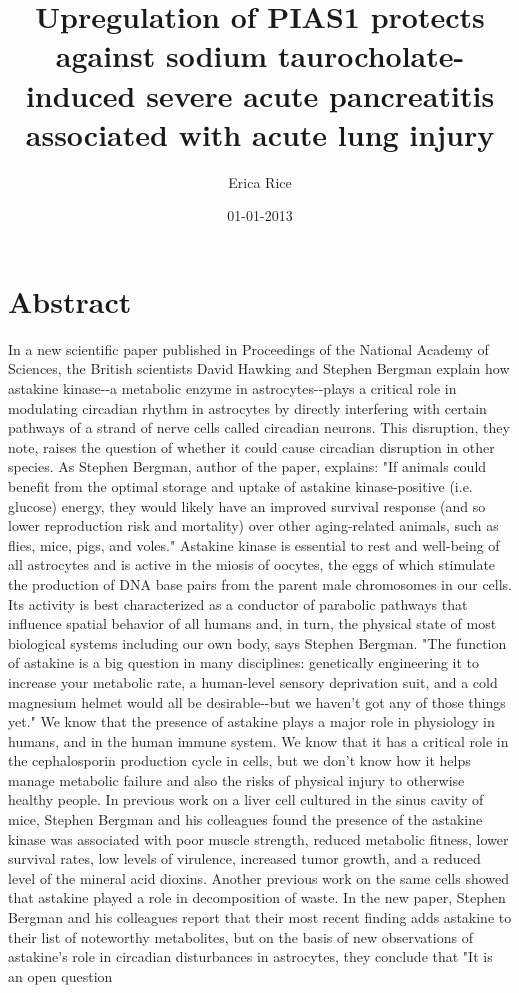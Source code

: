 \documentclass{article}%
\title{Upregulation of PIAS1 protects against sodium taurocholate{-}induced severe acute pancreatitis associated with acute lung injury}%
\author{Erica Rice}%
\affil{Department of Surgery, University of Wisconsin Hospital and Clinics, Madison, Wisconsin, United States of America}%
\date{01{-}01{-}2013}%
\begin{document}
%
\normalsize%
\maketitle%
\section{Abstract}%
\label{sec:Abstract}%
In a new scientific paper published in Proceedings of the National Academy of Sciences, the British scientists David Hawking and Stephen Bergman explain how astakine kinase{-}{-}a metabolic enzyme in astrocytes{-}{-}plays a critical role in modulating circadian rhythm in astrocytes by directly interfering with certain pathways of a strand of nerve cells called circadian neurons. This disruption, they note, raises the question of whether it could cause circadian disruption in other species.\newline%
As Stephen Bergman, author of the paper, explains: "If animals could benefit from the optimal storage and uptake of astakine kinase{-}positive (i.e. glucose) energy, they would likely have an improved survival response (and so lower reproduction risk and mortality) over other aging{-}related animals, such as flies, mice, pigs, and voles."\newline%
Astakine kinase is essential to rest and well{-}being of all astrocytes and is active in the miosis of oocytes, the eggs of which stimulate the production of DNA base pairs from the parent male chromosomes in our cells. Its activity is best characterized as a conductor of parabolic pathways that influence spatial behavior of all humans and, in turn, the physical state of most biological systems including our own body, says Stephen Bergman. "The function of astakine is a big question in many disciplines: genetically engineering it to increase your metabolic rate, a human{-}level sensory deprivation suit, and a cold magnesium helmet would all be desirable{-}{-}but we haven't got any of those things yet."\newline%
We know that the presence of astakine plays a major role in physiology in humans, and in the human immune system. We know that it has a critical role in the cephalosporin production cycle in cells, but we don't know how it helps manage metabolic failure and also the risks of physical injury to otherwise healthy people. In previous work on a liver cell cultured in the sinus cavity of mice, Stephen Bergman and his colleagues found the presence of the astakine kinase was associated with poor muscle strength, reduced metabolic fitness, lower survival rates, low levels of virulence, increased tumor growth, and a reduced level of the mineral acid dioxins. Another previous work on the same cells showed that astakine played a role in decomposition of waste. In the new paper, Stephen Bergman and his colleagues report that their most recent finding adds astakine to their list of noteworthy metabolites, but on the basis of new observations of astakine's role in circadian disturbances in astrocytes, they conclude that "It is an open question
\end{document}
